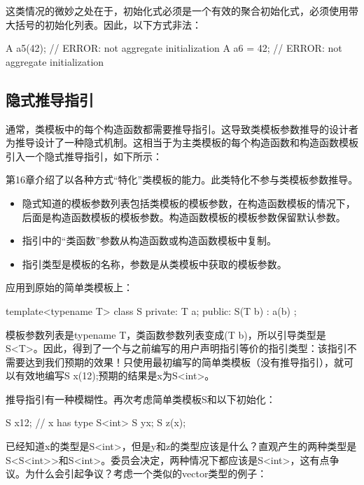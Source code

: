 这类情况的微妙之处在于，初始化式必须是一个有效的聚合初始化式，必须使用带大括号的初始化列表。因此，以下方式非法：

\begin{cpp}
A a5(42); // ERROR: not aggregate initialization
A a6 = 42; // ERROR: not aggregate initialization
\end{cpp}

\subsection{隐式推导指引}

通常，类模板中的每个构造函数都需要推导指引。这导致类模板参数推导的设计者为推导设计了一种隐式机制。这相当于为主类模板的每个构造函数和构造函数模板引入一个隐式推导指引，如下所示：

\begin{notice}
第16章介绍了以各种方式“特化”类模板的能力。此类特化不参与类模板参数推导。
\end{notice}

\begin{itemize}
\item 
隐式知道的模板参数列表包括类模板的模板参数，在构造函数模板的情况下，后面是构造函数模板的模板参数。构造函数模板的模板参数保留默认参数。

\item 
指引中的“类函数”参数从构造函数或构造函数模板中复制。

\item 
指引类型是模板的名称，参数是从类模板中获取的模板参数。
\end{itemize}	

应用到原始的简单类模板上：

\begin{cpp}
template<typename T>
class S {
	private:
	T a;
	public:
	S(T b) : a(b) {
	}
};
\end{cpp}

模板参数列表是typename T，类函数参数列表变成(T b)，所以引导类型是S<T>。因此，得到了一个与之前编写的用户声明指引等价的指引类型：该指引不需要达到我们预期的效果！只使用最初编写的简单类模板（没有推导指引），就可以有效地编写S x(12);预期的结果是x为S<int>。

推导指引有一种模糊性。再次考虑简单类模板S和以下初始化：

\begin{cpp}
S x{12}; // x has type S<int>
S y{x};
S z(x);
\end{cpp}

已经知道x的类型是S<int>，但是y和z的类型应该是什么？直观产生的两种类型是S<S<int>{}>和S<int>。委员会决定，两种情况下都应该是S<int>，这有点争议。为什么会引起争议？考虑一个类似的vector类型的例子：

